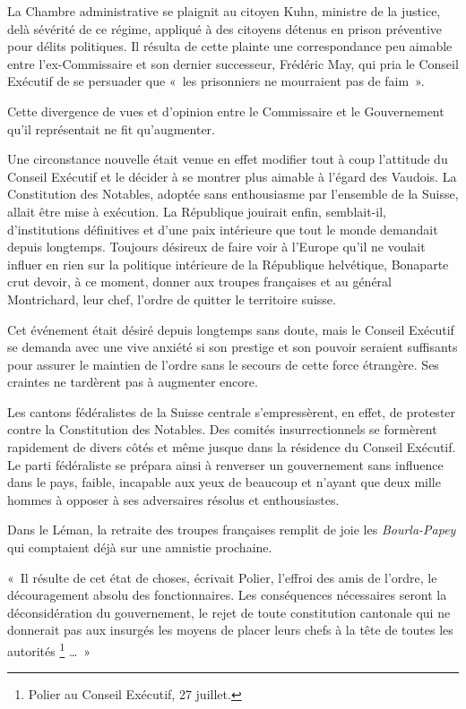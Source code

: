 \documentclass[french,twoside]{book} %
\newenvironment{quoteblock}%
  {\begin{quoting}}
  {\end{quoting}}
\newenvironment{quotebar}{%
    \def\FrameCommand{{\color{rubric!10!}\vrule width 0.5em} \hspace{0.9em}}%
    \def\OuterFrameSep{\itemsep} %
    \MakeFramed {\advance\hsize-\width \FrameRestore}
  }%
  {%
    \endMakeFramed
  }
\renewenvironment{quoteblock}%
  {%
    \savenotes
    \setstretch{0.9}
    \normalfont
    \begin{quotebar}
  }
  {%
    \end{quotebar}
    \spewnotes
  }
\begin{document}
La Chambre administrative se plaignit au citoyen Kuhn, ministre de la justice, delà sévérité de ce régime, appliqué à des citoyens détenus en prison préventive pour délits politiques. Il résulta de cette plainte une correspondance peu aimable entre l’ex-Commissaire et son dernier successeur, Frédéric May, qui pria le Conseil Exécutif de se persuader que « les prisonniers ne mourraient pas de faim ».\par
Cette divergence de vues et d’opinion entre le Commissaire et le Gouvernement qu’il représentait ne fit qu’augmenter.\par
Une circonstance nouvelle était venue en effet modifier tout à coup l’attitude du Conseil Exécutif et le décider à se montrer plus aimable à l’égard des Vaudois. La Constitution des Notables, adoptée sans enthousiasme par l’ensemble de la Suisse, allait être mise à exécution. La République jouirait enfin, semblait-il, d’institutions définitives et d’une paix intérieure que tout le monde demandait depuis longtemps. Toujours désireux de faire voir à l’Europe qu’il ne voulait influer en rien sur la politique intérieure de la République helvétique, Bonaparte crut devoir, à ce moment, donner aux troupes françaises et au général Montrichard, leur chef, l’ordre de quitter le territoire suisse.\par
Cet événement était désiré depuis longtemps sans doute, mais le Conseil Exécutif se demanda avec une vive anxiété si son prestige et son pouvoir seraient suffisants pour assurer le maintien de l’ordre sans le secours de cette force étrangère. Ses craintes ne tardèrent pas à augmenter encore.\par
Les cantons fédéralistes de la Suisse centrale s’empressèrent, en effet, de protester contre la Constitution des Notables. Des comités insurrectionnels se formèrent rapidement de divers côtés et même jusque dans la résidence du Conseil Exécutif. Le parti fédéraliste se prépara ainsi à renverser un gouvernement sans influence dans le pays, faible, incapable aux yeux de beaucoup et n’ayant que deux mille hommes à opposer à ses adversaires résolus et enthousiastes.\par
Dans le Léman, la retraite des troupes françaises remplit de joie les \emph{Bourla-Papey} qui comptaient déjà sur une amnistie prochaine.\par

\begin{quoteblock}
\noindent « Il résulte de cet état de choses, écrivait Polier, l’effroi des amis de l’ordre, le découragement absolu des fonctionnaires. Les conséquences nécessaires seront la déconsidération du gouvernement, le rejet de toute constitution cantonale qui ne donnerait pas aux insurgés les moyens de placer leurs chefs à la tête de toutes les autorités \footnote{Polier au Conseil Exécutif, 27 juillet.} … »\end{quoteblock}
\end{document}
